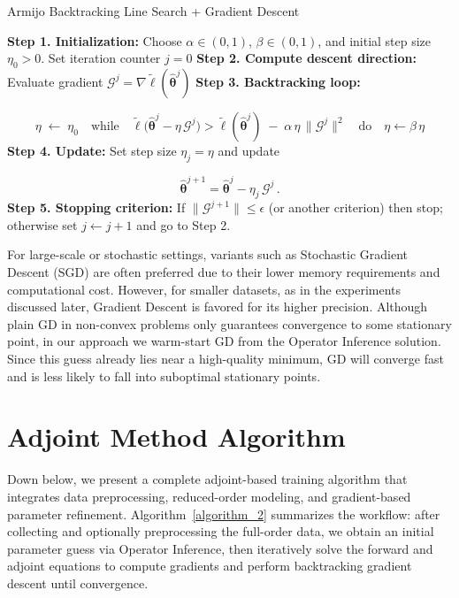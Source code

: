 \begin{center}
\begin{minipage}{0.95\textwidth}
\begin{algorithm}[H]
\label{algorithm_1}
\SetAlgoLined
\caption{Armijo Backtracking Line Search + Gradient Descent}
\textbf{Step 1. Initialization:} Choose $\alpha\in(0,1)$, $\beta\in(0,1)$, and initial step size $\eta_{0} > 0$. Set iteration counter $j=0$\;
\textbf{Step 2. Compute descent direction:} Evaluate gradient $\mathscr{G}^j = \nabla \tilde\ell(\hat{\bm\theta}^j)$\;
\textbf{Step 3. Backtracking loop:}

$$\eta \;\leftarrow\;\eta_{0}
    \quad\text{while}\quad
    \tilde\ell\bigl(\hat{\bm\theta}^j - \eta\,\mathscr{G}^j\bigr)
    >
    \tilde\ell(\hat{\bm\theta}^j)
    \;-\;\alpha\,\eta\,\|\mathscr{G}^j\|^2
    \quad\text{do}\quad
    \eta \leftarrow \beta\,\eta$$
\textbf{Step 4. Update:} Set step size $\eta_j = \eta$ and update

$$\hat{\bm\theta}^{j+1} = \hat{\bm\theta}^j - \eta_j\,\mathscr{G}^j\,.$$
\textbf{Step 5. Stopping criterion:} If $\|\mathscr{G}^{j+1}\|\le\epsilon$ (or another criterion) then stop; otherwise set $j\leftarrow j+1$ and go to Step 2.
\end{algorithm}
\end{minipage}
\end{center}

For large-scale or stochastic settings, variants such as Stochastic Gradient Descent (SGD) are often preferred \cite{ruder2017overviewgradientdescentoptimization} due to their lower memory requirements and computational cost. However, for smaller datasets, as in the experiments discussed later, Gradient Descent is favored for its higher precision. Although plain GD in non-convex problems only guarantees convergence to some stationary point, in our approach we warm-start GD from the Operator Inference solution. Since this guess already lies near a high-quality minimum, GD will converge fast and is less likely to fall into suboptimal stationary points.


\section{Adjoint Method Algorithm}

Down below, we present a complete adjoint-based training algorithm that integrates data preprocessing, reduced-order modeling, and gradient-based parameter refinement. Algorithm~\ref{algorithm_2} summarizes the workflow: after collecting and optionally preprocessing the full-order data, we obtain an initial parameter guess via Operator Inference, then iteratively solve the forward and adjoint equations to compute gradients and perform backtracking gradient descent until convergence.

